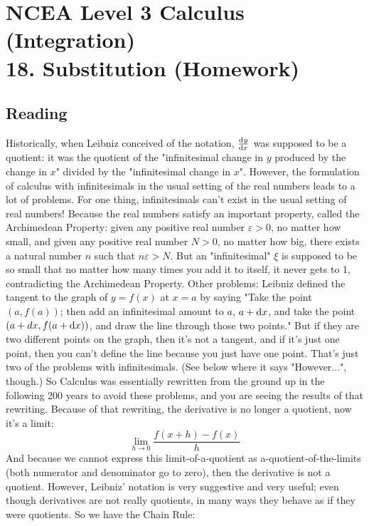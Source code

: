\documentclass{exam}
\theoremstyle{definition}
\theoremstyle{break}
\begin{document}
\section*{NCEA Level 3 Calculus (Integration)\\18. Substitution (Homework)}
\subsection*{Reading}
Historically, when Leibniz conceived of the notation, $ \od{y}{x} $ was supposed to be a quotient: it was the quotient of the "infinitesimal change in $y$ produced by the change in $x$" divided by the "infinitesimal change in $x$".
However, the formulation of calculus with infinitesimals in the usual setting of the real numbers leads to a lot of problems. For one thing, infinitesimals can't exist in the usual setting of real numbers! Because the real numbers satisfy an important property, called the Archimedean Property: given any positive real number $ \varepsilon > 0 $, no matter how small, and given any positive real number $ N > 0 $, no matter how big, there exists a natural number $n$ such that $n \varepsilon > N$. But an "infinitesimal" $ \xi $ is supposed to be so small that no matter how many times you add it to itself, it never gets to 1, contradicting the Archimedean Property.
Other problems: Leibniz defined the tangent to the graph of $y=f(x)$ at $x=a$ by saying "Take the point $(a,f(a))$; then add an infinitesimal amount to $a$, $a+\dif{x}$, and take the point $(a+dx,f(a+\dif{x}))$, and draw the line through those two points." But if they are two different points on the graph, then it's not a tangent, and if it's just one point, then you can't define the line because you just have one point. That's just two of the problems with infinitesimals. (See below where it says "However...", though.)
So Calculus was essentially rewritten from the ground up in the following 200 years to avoid these problems, and you are seeing the results of that rewriting. Because of that rewriting, the derivative is no longer a quotient, now it's a limit:
\begin{displaymath}
  \lim_{h \to 0} \frac{f(x + h) - f(x)}{h}
\end{displaymath}
And because we cannot express this limit-of-a-quotient as a-quotient-of-the-limits (both numerator and denominator go to zero), then the derivative is not a quotient.
However, Leibniz' notation is very suggestive and very useful; even though derivatives are not really quotients, in many ways they behave as if they were quotients. So we have the Chain Rule:
\end{document}
